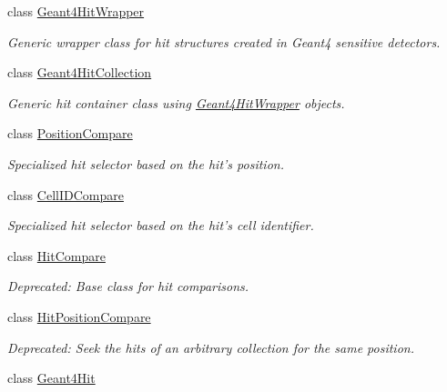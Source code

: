 \begin{DoxyCompactItemize}
class \hyperlink{class_d_d4hep_1_1_simulation_1_1_geant4_hit_wrapper}{Geant4HitWrapper}
\begin{DoxyCompactList}\small\item\em Generic wrapper class for hit structures created in Geant4 sensitive detectors. \item\end{DoxyCompactList}\item 
class \hyperlink{class_d_d4hep_1_1_simulation_1_1_geant4_hit_collection}{Geant4HitCollection}
\begin{DoxyCompactList}\small\item\em Generic hit container class using \hyperlink{class_d_d4hep_1_1_simulation_1_1_geant4_hit_wrapper}{Geant4HitWrapper} objects. \item\end{DoxyCompactList}\item 
class \hyperlink{class_d_d4hep_1_1_simulation_1_1_position_compare}{PositionCompare}
\begin{DoxyCompactList}\small\item\em Specialized hit selector based on the hit's position. \item\end{DoxyCompactList}\item 
class \hyperlink{class_d_d4hep_1_1_simulation_1_1_cell_i_d_compare}{CellIDCompare}
\begin{DoxyCompactList}\small\item\em Specialized hit selector based on the hit's cell identifier. \item\end{DoxyCompactList}\item 
class \hyperlink{class_d_d4hep_1_1_simulation_1_1_hit_compare}{HitCompare}
\begin{DoxyCompactList}\small\item\em Deprecated: Base class for hit comparisons. \item\end{DoxyCompactList}\item 
class \hyperlink{struct_d_d4hep_1_1_simulation_1_1_hit_position_compare}{HitPositionCompare}
\begin{DoxyCompactList}\small\item\em Deprecated: Seek the hits of an arbitrary collection for the same position. \item\end{DoxyCompactList}\item 
class \hyperlink{class_d_d4hep_1_1_simulation_1_1_geant4_hit}{Geant4Hit}

\end{DoxyCompactItemize}

